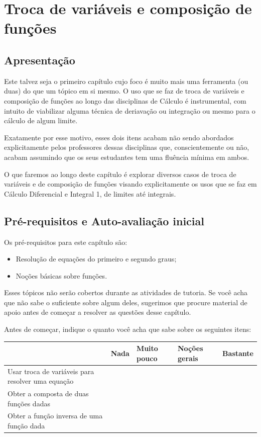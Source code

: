\documentclass[main_estudante.tex]{subfiles}
\begin{document}
\chapter{Troca de variáveis e composição de funções}

\section{Apresentação}

Este talvez seja o primeiro capítulo cujo foco é muito mais uma ferramenta (ou duas) do que um tópico em si mesmo. O uso que se faz de troca de variáveis e composição de funções ao longo das disciplinas de Cálculo é instrumental, com intuito de viabilizar alguma técnica de deriavação ou integração ou mesmo para o cálculo de algum limite.

Exatamente por esse motivo, esses dois itens acabam não sendo abordados explicitamente pelos professores dessas disciplinas que, conscientemente ou não, acabam assumindo que os seus estudantes tem uma fluência mínima em ambos.

O que faremos ao longo deste capítulo é explorar diversos casos de troca de variáveis e de composição de funções visando explicitamente os usos que se faz em Cálculo Diferencial e Integral 1, de limites até integrais.

\newpage

\section{Pré-requisitos e Auto-avaliação inicial}

Os pré-requisitos para este capítulo são:
\begin{itemize}
 \item Resolução de equações do primeiro e segundo graus;
 \item Noções básicas sobre funções.
\end{itemize}

Esses tópicos não serão cobertos durante as atividades de tutoria. Se você acha que não sabe o suficiente sobre algum deles, sugerimos que procure material de apoio antes de começar a resolver as questões desse capítulo.

Antes de começar, indique o quanto você acha que sabe sobre os seguintes itens:

\begin{center}
 \begin{tabular}{|p{35mm}||p{15mm}|p{15mm}|p{15mm}|p{15mm}|} 
 \hline
   & Nada & Muito pouco & Noções gerais & Bastante\\
 \hline
 Usar troca de variáveis para resolver uma equação &  &  &  &  \\ 
 \hline
 Obter a composta de duas funções dadas &  &  &  &  \\
 \hline
 Obter a função inversa de uma função dada &  &  &  &  \\
 \hline
\end{tabular}
\end{center}
\end{document}
